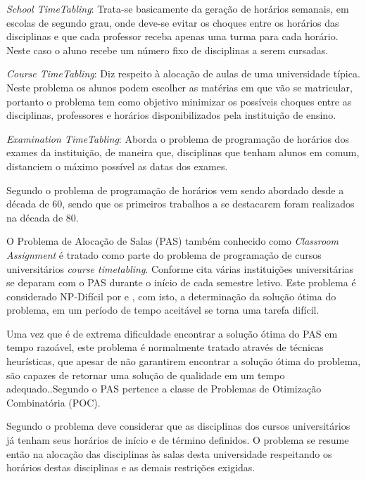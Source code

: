 \textit{School TimeTabling}: Trata-se basicamente da geração de horários semanais, em escolas de segundo grau, onde deve-se evitar os choques entre os horários das disciplinas e que cada professor receba apenas uma turma para cada horário. Neste caso o aluno recebe um número fixo de disciplinas a serem cursadas.\par

\textit{Course TimeTabling}: Diz respeito à alocação de aulas de uma universidade típica. Neste problema os alunos podem escolher as matérias em que vão se matricular, portanto o problema tem como objetivo minimizar os possíveis choques entre as disciplinas, professores e horários disponibilizados pela instituição de ensino.\par

\textit{Examination TimeTabling}: Aborda o problema de programação de horários dos exames da instituição, de maneira que, disciplinas que tenham alunos em comum, distanciem o máximo possível as datas dos exames.\par

Segundo \cite{pinheiro2001ambiente} o problema de programação de horários vem sendo abordado desde a década de 60, sendo que os primeiros trabalhos a se destacarem foram realizados na década de 80.\par

O Problema de Alocação de Salas (PAS) também conhecido como \textit{Classroom Assignment} é tratado como parte do problema de programação de cursos universitários \textit{course timetabling}. Conforme cita \cite{marinho2005heuristicas} várias instituições universitárias se deparam com o PAS durante o início de cada semestre letivo. Este problema é considerado NP-Difícil por \cite{even1975complexity} e \cite{carter1992classroom}, com isto, a determinação da solução ótima do problema, em um período de tempo aceitável se torna uma tarefa difícil.\par

Uma vez que é de extrema dificuldade encontrar a solução ótima do PAS em tempo razoável, este problema é normalmente tratado através de técnicas heurísticas, que apesar de não garantirem encontrar a solução ótima do problema, são capazes de retornar uma solução de qualidade em um tempo adequado.\cite{nascimento2005aplicaccao}.Segundo \cite{even1975complexity} o PAS pertence a classe de Problemas de Otimização Combinatória (POC).\par

Segundo \cite{kripkasimulated} o problema deve considerar que as disciplinas dos cursos universitários já tenham seus horários de início e de término definidos. O problema se resume então na alocação das disciplinas às salas desta universidade respeitando os horários destas disciplinas e as demais restrições exigidas.

